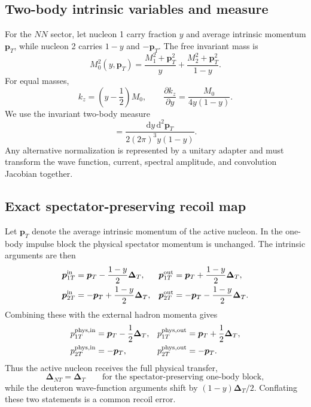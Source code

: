 \documentclass[11pt]{article}
\newcommand{\pT}{\bm{p}_{T}}
\newcommand{\DT}{\bm{\Delta}_{T}}
\newcommand{\DNT}{\bm{\Delta}_{N T}}
\newcommand{\dd}{\mathrm{d}}
\begin{document}
\subsection{Two-body intrinsic variables and measure}

For the \(NN\) sector, let nucleon 1 carry fraction \(y\) and average intrinsic
momentum \(\pT\), while nucleon 2 carries \(1-y\) and \(-\pT\).  The free
invariant mass is
\begin{equation}
 M_0^2(y,\pT)
 =\frac{M_1^2+\pT^2}{y}
 +\frac{M_2^2+\pT^2}{1-y}.
\label{eq:two-body-free-mass}
\end{equation}
For equal masses,
\begin{equation}
 k_z=\left(y-\frac12\right)M_0,
 \qquad
 \frac{\partial k_z}{\partial y}
 =\frac{M_0}{4y(1-y)}.
\label{eq:kz-jacobian}
\end{equation}
We use the invariant two-body measure
\begin{equation}
 [\dd\Gamma_2]
 =\frac{\dd y\,\dd^2\pT}{2(2\pi)^3y(1-y)}.
\label{eq:two-body-measure}
\end{equation}
Any alternative normalization is represented by a unitary adapter and must
transform the wave function, current, spectral amplitude, and convolution
Jacobian together.

\subsection{Exact spectator-preserving recoil map}

Let \(\pT\) denote the average intrinsic momentum of the active nucleon.  In
the one-body impulse block the physical spectator momentum is unchanged.
The intrinsic arguments are then
\begin{align}
 \bm p_{1T}^{\rm in}
 &=\pT-\frac{1-y}{2}\DT,
 &
 \bm p_{1T}^{\rm out}
 &=\pT+\frac{1-y}{2}\DT,
\label{eq:active-intrinsic-recoil}\\
 \bm p_{2T}^{\rm in}
 &=-\pT+\frac{1-y}{2}\DT,
 &
 \bm p_{2T}^{\rm out}
 &=-\pT-\frac{1-y}{2}\DT.
\label{eq:spectator-intrinsic-recoil}
\end{align}
Combining these with the external hadron momenta gives
\begin{align}
 p_{1T}^{\rm phys,in}&=\pT-\frac12\DT,&
 p_{1T}^{\rm phys,out}&=\pT+\frac12\DT,
\notag\\
 p_{2T}^{\rm phys,in}&=-\pT,&
 p_{2T}^{\rm phys,out}&=-\pT.
\label{eq:physical-one-body-recoil}
\end{align}
Thus the active nucleon receives the full physical transfer,
\begin{equation}
 \DNT=\DT
 \qquad\text{for the spectator-preserving one-body block},
\label{eq:active-full-transfer}
\end{equation}
while the deuteron wave-function arguments shift by \((1-y)\DT/2\).
Conflating these two statements is a common recoil error.
\end{document}
